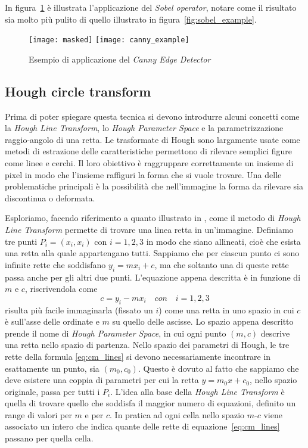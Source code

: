In figura~\ref{fig:canny_example} è illustrata l'applicazione del \textit{Sobel operator}, notare come il risultato sia molto più pulito di quello illustrato in figura~\ref{fig:sobel_example}.
\begin{figure}[ht]
  \begin{center}
    \texttt{[image: masked]}
    \texttt{[image: canny\_example]}
    \caption{Esempio di applicazione del \textit{Canny Edge Detector}}
    \label{fig:canny_example}
  \end{center}
\end{figure}

\subsection {Hough circle transform}
Prima di poter spiegare questa tecnica si devono introdurre alcuni concetti come la \textit{Hough Line Transform}, lo \textit{Hough Parameter Space} e la parametrizzazione raggio-angolo di una retta.
Le trasformate di Hough sono largamente usate come metodi di estrazione delle caratteristiche permettono di rilevare semplici figure come linee e cerchi.
Il loro obiettivo è raggruppare correttamente un insieme di pixel in modo che l'insieme raffiguri la forma che si vuole trovare.
Una delle problematiche principali è la possibilità che nell'immagine la forma da rilevare sia discontinua o deformata.

Esploriamo, facendo riferimento a quanto illustrato in \cite{hough-line}, come il metodo di \textit{Hough Line Transform} permette di trovare una linea retta in un'immagine.
Definiamo tre punti $P_i=(x_i, x_i)$ con $i=1,2,3$ in modo che siano allineati, cioè che esista una retta alla quale appartengano tutti.
Sappiamo che per ciascun punto ci sono infinite rette che soddisfano $y_i = m x_i + c$, ma che soltanto una di queste rette passa anche per gli altri due punti.
L'equazione appena descritta è in funzione di $m$ e $c$, riscrivendola come
\begin{equation} \label{eq:cm_lines}
  c = y_i - m x_i \quad con \quad i=1,2,3
\end{equation}
risulta più facile immaginarla (fissato un $i$) come una retta in uno spazio in cui $c$ è sull'asse delle ordinate e $m$ su quello delle ascisse.
Lo spazio appena descritto prende il nome di \textit{Hough Parameter Space}, in cui ogni punto $(m,c)$ descrive una retta nello spazio di partenza.
Nello spazio dei parametri di Hough, le tre rette della formula \ref{eq:cm_lines} si devono necessariamente incontrare in esattamente un punto, sia $(m_0,c_0)$.
Questo è dovuto al fatto che sappiamo che deve esistere una coppia di parametri per cui la retta $y = m_0 x + c_0$, nello spazio originale, passa per tutti i $P_i$.
L'idea alla base della \textit{Hough Line Transform} è quella di trovare quello che soddisfa il maggior numero di equazioni, definito un range di valori per $m$ e per $c$.
In pratica ad ogni cella nello spazio $m$-$c$ viene associato un intero che indica quante delle rette di equazione~\ref{eq:cm_lines} passano per quella cella.

